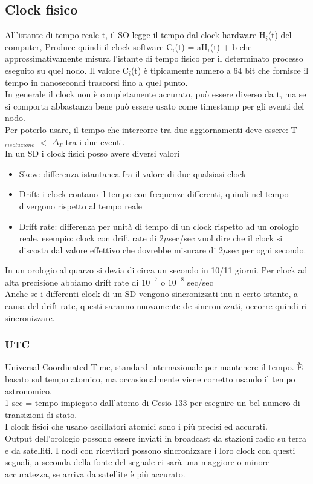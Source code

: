 \documentclass{article}
\begin{document}
\subsection{Clock fisico}
All'istante di tempo reale t, il SO legge il tempo dal clock hardware H$_i$(t) del computer, Produce quindi il clock software C$_i$(t) = aH$_i$(t) + b che approssimativamente misura l'istante di tempo fisico per il determinato processo eseguito su quel nodo. Il valore C$_i$(t) è tipicamente numero a 64 bit che fornisce il tempo in nanosecondi trascorsi fino a quel punto.\\ In generale il clock non è completamente accurato, può essere diverso da t, ma se si comporta abbastanza bene può essere usato come timestamp per gli eventi del nodo. \\ Per poterlo usare, il tempo che intercorre tra due aggiornamenti deve essere: T$_{risoluzione}$ $<$ $\Delta_T$ tra i due eventi.\\ In un SD i clock fisici posso avere diversi valori
\begin{itemize}
\item Skew: differenza istantanea fra il valore di due qualsiasi clock
\item Drift: i clock contano il tempo con frequenze differenti, quindi nel tempo divergono rispetto al tempo reale
\item Drift rate: differenza per unità di tempo di un clock rispetto ad un orologio reale. esempio: clock con drift rate di 2$\mu$sec/sec vuol dire che il clock si discosta dal valore effettivo che dovrebbe misurare di 2$\mu$sec per ogni secondo.
\end{itemize}
In un orologio al quarzo si devia di circa un secondo in 10/11 giorni. Per clock ad alta precisione abbiamo drift rate di $10^{-7}$ o  $10^{-8}$ sec/sec\\ Anche se i differenti clock di un SD vengono sincronizzati inu n certo istante, a causa del drift rate, questi saranno nuovamente de sincronizzati, occorre quindi ri sincronizzare.
\subsubsection{UTC}
Universal Coordinated Time, standard internazionale per mantenere il tempo. È basato sul tempo atomico, ma occasionalmente viene corretto usando il tempo astronomico. \\ 1 sec = tempo impiegato dall'atomo di Cesio 133 per eseguire un bel numero di transizioni di stato.\\ I clock fisici che usano oscillatori atomici sono i più precisi ed accurati. \\ Output dell'orologio possono essere inviati in broadcast da stazioni radio su terra e da satelliti. I nodi con ricevitori possono sincronizzare i loro clock con questi segnali, a seconda della fonte del segnale ci sarà una maggiore o minore accuratezza, se arriva da satellite è più accurato.
\end{document}
